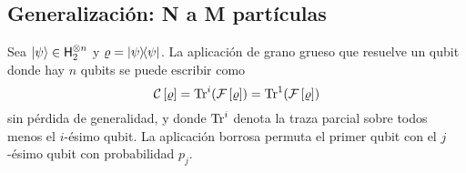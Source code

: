\subsection{Generalización: N a M partículas}

Sea $\ket{\psi}\in{\sf H}_{2}^{\otimes n}$ y $\varrho=\dyad{\psi}$. La aplicación de grano grueso que resuelve un qubit donde hay $n$ qubits se puede escribir como
\begin{equation*}
    \mathcal{C}\left[\varrho\right]=\Tr^{i}(\mathcal{F}\left[\varrho\right])=\Tr^{1}(\mathcal{F}\left[\varrho\right])
\end{equation*}
sin pérdida de generalidad, y donde $\Tr^{i}$ denota la traza parcial sobre todos menos el $i$-ésimo qubit. La aplicación borrosa permuta el primer qubit con el $j$-ésimo qubit con probabilidad $p_{j}$.